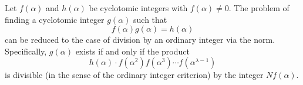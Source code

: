 Let $f(\alpha)$ and $h(\alpha)$ be cyclotomic integers with $f(\alpha) \neq 0$. The problem of finding a cyclotomic integer $g(\alpha)$ such that
$$f(\alpha)g(\alpha) = h(\alpha)$$
can be reduced to the case of division by an ordinary integer via the norm. Specifically, $g(\alpha)$ exists if and only if the product
$$h(\alpha) \cdot f(\alpha^2)f(\alpha^3)\cdots f(\alpha^{\lambda-1})$$
is divisible (in the sense of the ordinary integer criterion) by the integer $Nf(\alpha)$.
